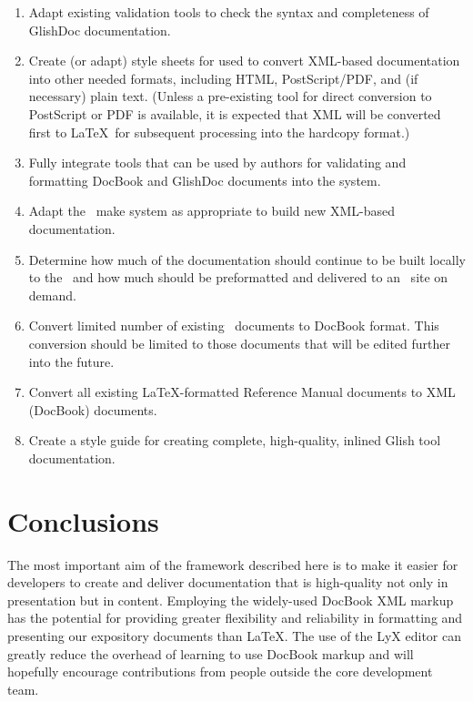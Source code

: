 \begin{enumerate}

\item Adapt existing validation tools to check the syntax and
completeness of GlishDoc documentation.  

\item Create (or adapt) style sheets for used to convert
XML-based documentation into other needed formats, including HTML,
Post\-Script/PDF, and (if necessary) plain text.  (Unless a pre-existing
tool for direct conversion to PostScript or PDF is available, it is
expected that XML will be converted first to \LaTeX\ for subsequent
processing into the hardcopy format.)  

\item Fully integrate tools that can be used by authors for validating
and formatting DocBook and GlishDoc documents into the \aipspp
system.  

\item Adapt the \aipspp\ make system as appropriate to build new
XML-based documentation.

\item Determine how much of the documentation should continue to be
built locally to the \aipspp\ and how much should be preformatted and
delivered to an \aipspp\ site on demand.

\item Convert limited number of existing \aipspp\ documents to DocBook
format.  This conversion should be limited to those documents that
will be edited further into the future.  

\item Convert all existing \LaTeX-formatted Reference Manual documents
to XML (DocBook) documents.  

\item Create a style guide for creating complete, high-quality,
inlined Glish tool documentation.  

\end{enumerate}

\section{Conclusions}

The most important aim of the framework described here is to make it
easier for developers to create and deliver documentation that is
high-quality not only in presentation but in content.  Employing the
widely-used DocBook XML markup has the potential for providing greater
flexibility and reliability in formatting and presenting our
expository documents than \LaTeX.  The use of the LyX editor can
greatly reduce the overhead of learning to use DocBook markup and will
hopefully encourage contributions from people outside the core
development team.  

